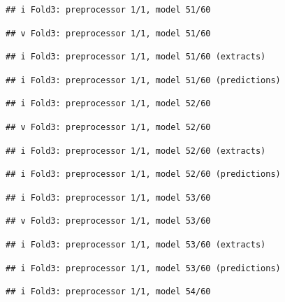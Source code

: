 \documentclass[
]{article}
\begin{document}
\begin{verbatim}
## i Fold3: preprocessor 1/1, model 51/60
\end{verbatim}

\begin{verbatim}
## v Fold3: preprocessor 1/1, model 51/60
\end{verbatim}

\begin{verbatim}
## i Fold3: preprocessor 1/1, model 51/60 (extracts)
\end{verbatim}

\begin{verbatim}
## i Fold3: preprocessor 1/1, model 51/60 (predictions)
\end{verbatim}

\begin{verbatim}
## i Fold3: preprocessor 1/1, model 52/60
\end{verbatim}

\begin{verbatim}
## v Fold3: preprocessor 1/1, model 52/60
\end{verbatim}

\begin{verbatim}
## i Fold3: preprocessor 1/1, model 52/60 (extracts)
\end{verbatim}

\begin{verbatim}
## i Fold3: preprocessor 1/1, model 52/60 (predictions)
\end{verbatim}

\begin{verbatim}
## i Fold3: preprocessor 1/1, model 53/60
\end{verbatim}

\begin{verbatim}
## v Fold3: preprocessor 1/1, model 53/60
\end{verbatim}

\begin{verbatim}
## i Fold3: preprocessor 1/1, model 53/60 (extracts)
\end{verbatim}

\begin{verbatim}
## i Fold3: preprocessor 1/1, model 53/60 (predictions)
\end{verbatim}

\begin{verbatim}
## i Fold3: preprocessor 1/1, model 54/60
\end{verbatim}
\end{document}
